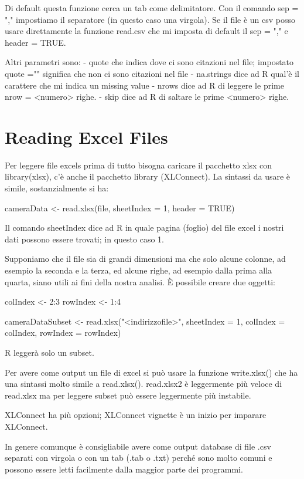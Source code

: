 Di default questa funzione cerca un tab come delimitatore. Con il comando sep = "," impostiamo il separatore (in questo caso una virgola).
Se il file è un csv posso usare direttamente la funzione read.csv che mi imposta di default il sep = "," e header = TRUE.

Altri parametri sono:
- quote che indica dove ci sono citazioni nel file; impostato quote ="" significa che non ci sono citazioni nel file
- na.strings dice ad R qual'è il carattere che mi indica un missing value
- nrows dice ad R di leggere le prime nrow = <numero> righe.
- skip dice ad R di saltare le prime <numero> righe.


\section{Reading Excel Files}

Per leggere file excels prima di tutto bisogna caricare il pacchetto xlsx con library(xlsx), c'è anche il pacchetto library (XLConnect).
La sintassi da usare è simile, sostanzialmente si ha:

cameraData <- read.xlsx(file, sheetIndex = 1, header = TRUE)

Il comando sheetIndex dice ad R in quale pagina (foglio) del file excel i nostri dati
possono essere trovati; in questo caso 1.

Supponiamo che il file sia di grandi dimensioni ma che solo alcune colonne, ad esempio la seconda e la terza, ed alcune righe, ad esempio dalla prima alla quarta, siano utili ai fini della nostra analisi.
È possibile creare due oggetti:

colIndex <- 2:3
rowIndex <- 1:4

cameraDataSubset <- read.xlsx("<indirizzofile>", sheetIndex = 1, colIndex = colIndex, rowIndex = rowIndex)

R leggerà solo un subset.

Per avere come output un file di excel si può usare la funzione write.xlsx() che ha una sintassi molto simile a read.xlsx().
read.xlsx2 è leggermente più veloce di read.xlsx ma per leggere subset può essere leggermente più instabile.

XLConnect ha più opzioni; XLConnect vignette è un inizio per imparare XLConnect.

In genere comunque è consigliabile avere come output database di file .csv separati con virgola o con un tab (.tab o .txt) perché sono molto comuni e possono essere letti facilmente dalla maggior parte dei programmi.


